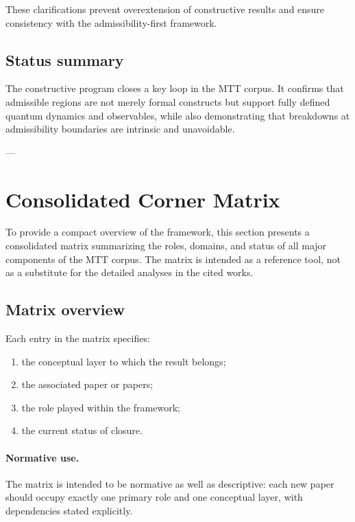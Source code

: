 \documentclass[11pt]{article}
\begin{document}
These clarifications prevent overextension of constructive results and ensure consistency with the admissibility-first framework.

\subsection{Status summary}

The constructive program closes a key loop in the MTT corpus. It confirms that admissible regions are not merely formal constructs but support fully defined quantum dynamics and observables, while also demonstrating that breakdowns at admissibility boundaries are intrinsic and unavoidable.

---

\section{Consolidated Corner Matrix}

To provide a compact overview of the framework, this section presents a consolidated matrix summarizing the roles, domains, and status of all major components of the MTT corpus. The matrix is intended as a reference tool, not as a substitute for the detailed analyses in the cited works.

\subsection{Matrix overview}

Each entry in the matrix specifies:

\begin{enumerate}
\item the conceptual layer to which the result belongs;
\item the associated paper or papers;
\item the role played within the framework;
\item the current status of closure.
\end{enumerate}

\paragraph{Normative use.}
The matrix is intended to be normative as well as descriptive: each new paper should occupy exactly one primary role
and one conceptual layer, with dependencies stated explicitly.
\end{document}
